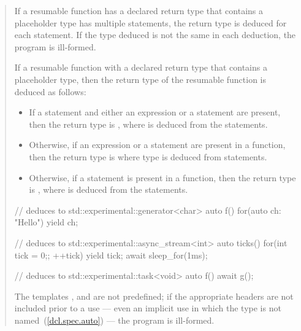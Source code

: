 \begin{quote}
\setcounter{Paras}{15}
\pnum
If a resumable function has a declared return type that contains a placeholder type has multiple  statements, the return type is deduced for each
 statement. If the type deduced is not the same in each
deduction, the program is ill-formed.

\pnum
If a resumable function with a declared return type that contains a placeholder type, then the return type of the resumable function is deduced as follows:

\begin{itemize}
\item If a  statement and either an  expression or a  statement are present, then
the return type is , where  is deduced from the  statements.

\item Otherwise, if an  expression or a  statement are present in a function, then
the return type is  where type  is deduced from 
 statements.

\item Otherwise, if a  statement is present in a function, then the return type is \linebreak
{},
where  is deduced from the  statements.

\end{itemize}
\enterexample
\begin{codeblock}
// deduces to std::experimental::generator<char>
auto f() { for(auto ch: "Hello") yield ch; }

// deduces to std::experimental::async_stream<int>
auto ticks() {
  for(int tick = 0;; ++tick) {
    yield tick;
    await sleep_for(1ms);
  }
}

// deduces to std::experimental::task<void>
auto f() {  await g(); }

\end{codeblock}
\exitexample

\pnum
The templates  , 
 and 
 are not predefined;
if the appropriate headers are not included prior to a use --- even an implicit use in which the type is not
named~(\ref{dcl.spec.auto}) --- the program is ill-formed.
\end{quote}
